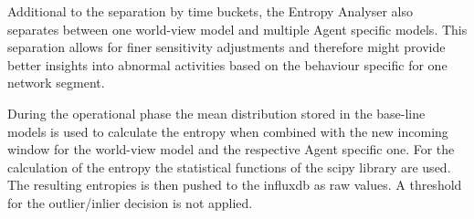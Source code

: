 Additional to the separation by time buckets, the Entropy Analyser also separates between one world-view model and multiple Agent specific models. This separation allows for finer sensitivity adjustments and therefore might provide better insights into abnormal activities based on the behaviour specific for one network segment.

During the operational phase the mean distribution stored in the base-line models is used to calculate the entropy when combined with the new incoming window for the world-view model and the respective Agent specific one.
For the calculation of the entropy the statistical functions of the \gls{scipy} library are used.
The resulting entropies is then pushed to the \gls{influxdb} as raw values. A threshold for the outlier/inlier decision is not applied.
